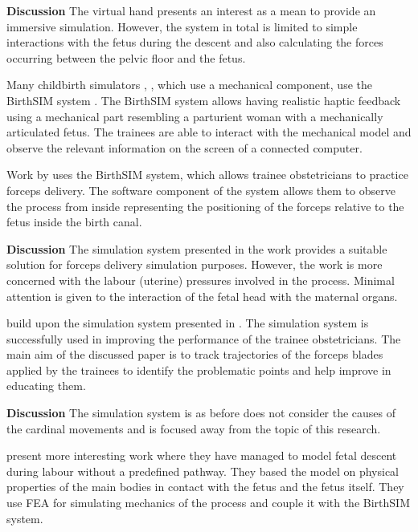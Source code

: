 \textbf{Discussion} The virtual hand presents an interest as a mean to provide an immersive simulation. However, the system in total is limited to simple interactions with the fetus during the descent and also calculating the forces occurring between the pelvic floor and the fetus.
%

Many childbirth simulators \citep{Moreau}, \citep{BUTTIN}, which use a mechanical component, use the BirthSIM system \citep{BIRTHSIM}. The BirthSIM system allows having realistic haptic feedback using a mechanical part resembling a parturient woman with a mechanically articulated fetus. The trainees are able to interact with the mechanical model and observe the relevant information on the screen of a connected computer.

Work by \textbf{\citet{Moreau}} uses the BirthSIM system, which allows trainee obstetricians to practice forceps delivery. The software component of the system allows them to observe the process from inside representing the positioning of the forceps relative to the fetus inside the birth canal.

\textbf{Discussion} The simulation system presented in the work provides a suitable solution for forceps delivery simulation purposes. However, the work is more concerned with the labour (uterine) pressures involved in the process. Minimal attention is given to the interaction of the fetal head with the maternal organs.

\textbf{\citet{Dupuis2009}} build upon the simulation system presented in \cite{Moreau}. The simulation system is successfully used in improving the performance of the trainee obstetricians. The main aim of the discussed paper is to track trajectories of the forceps blades applied by the trainees to identify the problematic points and help improve in educating them.

\textbf{Discussion} The simulation system is as before does not consider the causes of the cardinal movements and is focused away from the topic of this research.

\textbf{\citet{BUTTIN}} present more interesting work where they have managed to model fetal descent during labour without a predefined pathway. They based the model on physical properties of the main bodies in contact with the fetus and the fetus itself. They use FEA for simulating mechanics of the process and couple it with the BirthSIM system.


